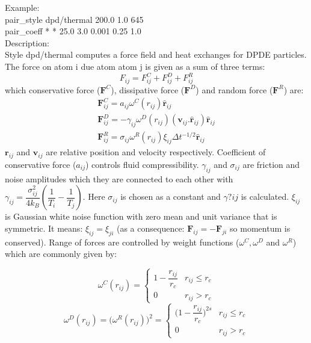 Example:\\
pair\_style dpd/thermal 200.0 1.0 645\\
pair\_coeff * * 25.0  3.0 0.001 0.25 1.0\\
Description:\\
Style dpd/thermal computes a force field and heat exchanges for DPDE particles. The force on atom i due atom atom j is given as a sum of three terms:
\begin{equation}
F_{ij} = F_{ij}^{C}+F_{ij}^{D}+F_{ij}^{R}
\end{equation}
which conservative force ($\textbf{F}^{C} $), dissipative force ($ \textbf{F}^{D} $) and random force ($ \textbf{F}^{R} $) are:\\
\begin{equation}
\begin{aligned}
\textbf{F}_{ij}^{C} = a_{ij} \omega ^{C}(r_{ij}) \hat{\textbf{r}}_{ij}\\ 
\textbf{F}_{ij}^{D} = -\gamma_{ij} \omega ^{D}(r_{ij}) (\textbf{v}_{ij}.\hat{\textbf{r}}_{ij}) \hat{\textbf{r}}_{ij}  \\
\textbf{F}_{ij}^{R} = \sigma_{ij} \omega ^{R}(r_{ij}) \xi _{ij} \Delta t^{-1/2}\hat{\textbf{r}}_{ij}
\end{aligned}
\end{equation}
$ \textbf{r}_{ij} $ and $ \textbf{v}_{ij} $ are relative position and velocity respectively. Coefficient of conservative force ($ a_{ij} $) controls fluid compressibility. $ \gamma _{ij}$ and $ \sigma _{ij}$ are  friction and noise amplitudes which they are connected to each other with $ \gamma _{ij} = \dfrac{\sigma_{ij} ^{2}}{4k_{B}}\left( \dfrac{1}{T_{i}}-\dfrac{1}{T_{j}}\right)$. Here $ \sigma _{ij}$ is chosen as a constant and $\gamma?{ij}$ is calculated. $ \xi _{ij} $ is Gaussian white noise function with zero mean and unit variance that is symmetric. It means: $ \xi _{ij} = \xi _{ji} $ (as a consequence: $ \textbf{F}_{ij} = - \textbf{F}_{ji} $ so momentum is conserved). Range of forces are controlled by weight functions ($ \omega ^{C} , \omega ^{D}$ and $ \omega ^{R} $) which are commonly given by:\\
\begin{center}
	\begin{equation}
	\omega ^{C}(r_{ij}) =
	\begin{cases}
	1-\dfrac{r_{ij}}{r_{c}} & r_{ij} \leq r_{c}\\
	0 & r_{ij} > r_{c}
	\end{cases} 
	\end{equation}
	\begin{equation}
	\omega ^{D}(r_{ij}) = \big(\omega ^{R}(r_{ij})\big)^{2}=
	\begin{cases}
	\big(1-\dfrac{r_{ij}}{r_{c}}\big)^{2s} & r_{ij} \leq r_{c}\\
	0 & r_{ij} > r_{c}
	\end{cases} 
	\end{equation}
\end{center}
